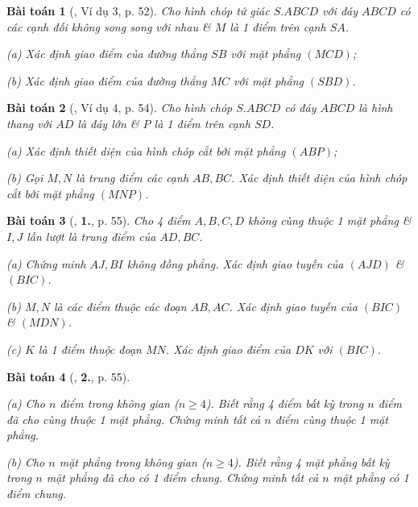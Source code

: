 \documentclass{article}
\numberwithin{equation}{section}
\newtheorem{baitoan}{Bài toán}[section]
\begin{document}
\begin{baitoan}[\cite{TL_chuyen_Toan_Hinh_Hoc_11}, Ví dụ 3, p. 52]
	Cho hình chóp tứ giác $S.ABCD$ với đáy $ABCD$ có các cạnh đối không song song với nhau \& $M$ là 1 điểm trên cạnh $SA$.
	\begin{enumerate*}
		\item[(a)] Xác định giao điểm của đường thẳng $SB$ với mặt phẳng $(MCD)$;
		\item[(b)] Xác định giao điểm của đường thẳng $MC$ với mặt phẳng $(SBD)$.
	\end{enumerate*}
\end{baitoan}

\begin{baitoan}[\cite{TL_chuyen_Toan_Hinh_Hoc_11}, Ví dụ 4, p. 54]
	Cho hình chóp $S.ABCD$ có đáy $ABCD$ là hình thang với $AD$ là đáy lớn \& $P$ là 1 điểm trên cạnh $SD$.
	\begin{enumerate*}
		\item[(a)] Xác định thiết diện của hình chóp cắt bởi mặt phẳng $(ABP)$;
		\item[(b)] Gọi $M,N$ là trung điểm các cạnh $AB,BC$. Xác định thiết diện của hình chóp cắt bởi mặt phẳng $(MNP)$.
	\end{enumerate*}
\end{baitoan}

\begin{baitoan}[\cite{TL_chuyen_Toan_Hinh_Hoc_11}, \textbf{1.}, p. 55]
	Cho 4 điểm $A,B,C,D$ không cùng thuộc 1 mặt phẳng \& $I,J$ lần lượt là trung điểm của $AD,BC$.
	\begin{enumerate*}
		\item[(a)] Chứng minh $AJ,BI$ không đồng phẳng. Xác định giao tuyến của $(AJD)$ \& $(BIC)$.
		\item[(b)] $M,N$ là các điểm thuộc các đoạn $AB,AC$. Xác định giao tuyến của $(BIC)$ \& $(MDN)$.
		\item[(c)] $K$ là 1 điểm thuộc đoạn $MN$. Xác định giao điểm của $DK$ với $(BIC)$.
	\end{enumerate*}
\end{baitoan}

\begin{baitoan}[\cite{TL_chuyen_Toan_Hinh_Hoc_11}, \textbf{2.}, p. 55]
	\begin{enumerate*}
		\item[(a)] Cho $n$ điểm trong không gian ($n\ge 4$). Biết rằng 4 điểm bất kỳ trong $n$ điểm đã cho cùng thuộc 1 mặt phẳng. Chứng minh tất cả $n$ điểm cùng thuộc 1 mặt phẳng.
		\item[(b)] Cho $n$ mặt phẳng trong không gian ($n\ge 4$). Biết rằng 4 mặt phẳng bất kỳ trong $n$ mặt phẳng đã cho có 1 điểm chung. Chứng minh tất cả $n$ mặt phẳng có 1 điểm chung.
	\end{enumerate*}
\end{baitoan}
\end{document}
